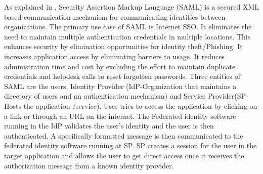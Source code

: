 \begin{enumerate}
As explained in \label{\detokenize{i524/technologies:id682}}{\hyperref[\detokenize{i524/technologies:saml}]{\sphinxcrossref{{[}593{]}}}}, Security Assertion Markup Language
(SAML) is a secured XML based communication mechanism for
communicating identities between organizations. The primary use
case of SAML is Internet SSO. It eliminates the need to maintain
multiple authentication credentials in multiple locations. This
enhances security by elimination opportunities for identity
theft/Phishing. It increases application access by eliminating
barriers to usage. It reduces administration time and cost by
excluding the effort to maintain duplicate credentials and
helpdesk calls to reset forgotten passwords. Three entities of
SAML are the users, Identity Provider (IdP-Organization that
maintains a directory of users and an authentication mechanism)
and Service Provider(SP-Hosts the application /service). User
tries to access the application by clicking on a link or through
an URL on the internet. The Federated identity software running
in the IdP validates the user’s identity and the user is then
authenticated. A specifically formatted message is then
communicated to the federated identity software running at SP. SP
creates a session for the user in the target application and
allows the user to get direct access once it receives the
authorization message from a known identity provider.

\end{enumerate}


